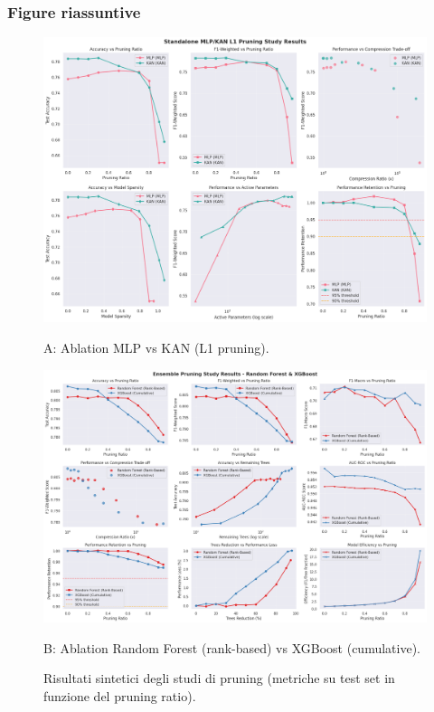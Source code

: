 \documentclass[a4paper,12pt]{report}
\begin{document}
	\subsubsection{Figure riassuntive}
	\begin{figure}[H]
		\centering
		\begin{minipage}{0.49\textwidth}
			\centering
			\includegraphics[width=\linewidth]{img/abl_kanvsmlp_pm.png}
			\caption*{A: Ablation MLP vs KAN (L1 pruning).}
		\end{minipage}\hfill
		\begin{minipage}{0.49\textwidth}
			\centering
			\includegraphics[width=\linewidth]{img/abl_xgbvsrf_pm.png}
			\caption*{B: Ablation Random Forest (rank-based) vs XGBoost (cumulative).}
		\end{minipage}
		\caption{Risultati sintetici degli studi di pruning (metriche su test set in funzione del pruning ratio).}
	\end{figure}
	
\end{document}

